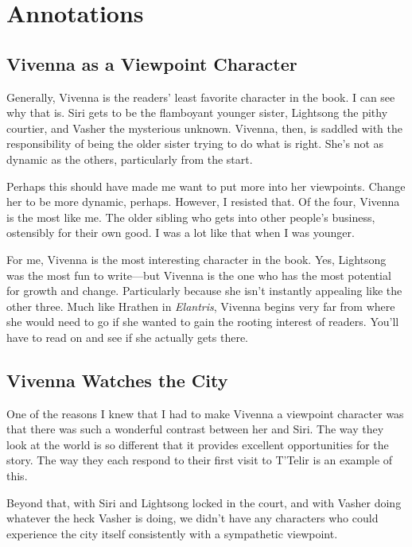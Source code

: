 \section*{Annotations}

\subsection*{Vivenna as a Viewpoint Character}

Generally, Vivenna is the readers’ least favorite character in the book. I can see why that is. Siri gets to be the flamboyant younger sister, Lightsong the pithy courtier, and Vasher the mysterious unknown. Vivenna, then, is saddled with the responsibility of being the older sister trying to do what is right. She’s not as dynamic as the others, particularly from the start.

Perhaps this should have made me want to put more into her viewpoints. Change her to be more dynamic, perhaps. However, I resisted that. Of the four, Vivenna is the most like me. The older sibling who gets into other people’s business, ostensibly for their own good. I was a lot like that when I was younger.

For me, Vivenna is the most interesting character in the book. Yes, Lightsong was the most fun to write—but Vivenna is the one who has the most potential for growth and change. Particularly because she isn’t instantly appealing like the other three. Much like Hrathen in \textit{Elantris}, Vivenna begins very far from where she would need to go if she wanted to gain the rooting interest of readers. You’ll have to read on and see if she actually gets there.

\subsection*{Vivenna Watches the City}

One of the reasons I knew that I had to make Vivenna a viewpoint character was that there was such a wonderful contrast between her and Siri. The way they look at the world is so different that it provides excellent opportunities for the story. The way they each respond to their first visit to T’Telir is an example of this.

Beyond that, with Siri and Lightsong locked in the court, and with Vasher doing whatever the heck Vasher is doing, we didn’t have any characters who could experience the city itself consistently with a sympathetic viewpoint.

